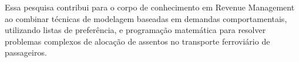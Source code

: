 Essa pesquisa contribui para o corpo de conhecimento em Revenue Management ao combinar técnicas de modelagem baseadas em demandas comportamentais, utilizando listas de preferência, e programação matemática para resolver problemas complexos de alocação de assentos no transporte ferroviário de passageiros.
